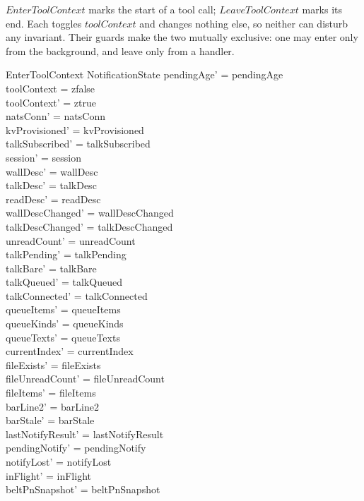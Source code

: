 \documentclass[a4paper,10pt,fleqn]{article}
\begin{document}
$EnterToolContext$ marks the start of a tool call; $LeaveToolContext$
marks its end.  Each toggles $toolContext$ and changes nothing else, so
neither can disturb any invariant.  Their guards make the two mutually
exclusive: one may enter only from the background, and leave only from a
handler.

\begin{schema}{EnterToolContext}
  \Delta NotificationState
  \where
  pendingAge' = pendingAge \\
  toolContext = zfalse \\
  toolContext' = ztrue \\
  natsConn' = natsConn \\
  kvProvisioned' = kvProvisioned \\
  talkSubscribed' = talkSubscribed \\
  session' = session \\
  wallDesc' = wallDesc \\
  talkDesc' = talkDesc \\
  readDesc' = readDesc \\
  wallDescChanged' = wallDescChanged \\
  talkDescChanged' = talkDescChanged \\
  unreadCount' = unreadCount \\
  talkPending' = talkPending \\
  talkBare' = talkBare \\
  talkQueued' = talkQueued \\
  talkConnected' = talkConnected \\
  queueItems' = queueItems \\
  queueKinds' = queueKinds \\
  queueTexts' = queueTexts \\
  currentIndex' = currentIndex \\
  fileExists' = fileExists \\
  fileUnreadCount' = fileUnreadCount \\
  fileItems' = fileItems \\
  barLine2' = barLine2 \\
  barStale' = barStale \\
  lastNotifyResult' = lastNotifyResult \\
  pendingNotify' = pendingNotify \\
  notifyLost' = notifyLost \\
  inFlight' = inFlight \\
  beltPnSnapshot' = beltPnSnapshot \\

\end{schema}
\end{document}
